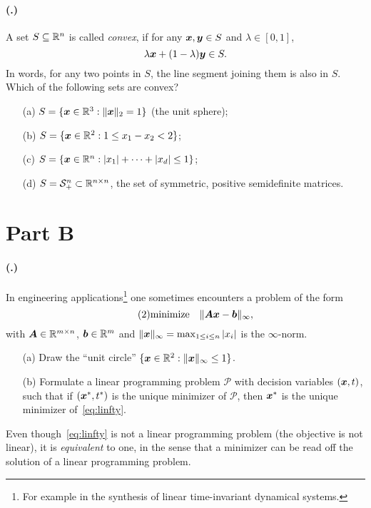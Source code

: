 \documentclass{article}
\newcounter{problemSheetNumber}
\newcounter{problems}
\renewcommand{\problem}{\paragraph{(\theproblemSheetNumber.\theproblems)}\addtocounter{problems}{1}}
\begin{document}
\problem A set $S\subseteq \mathbb{R}^n$ is called {\em convex}, if for any $\bm{x},\bm{y}\in S$ and $\lambda\in [0,1]$, 
\begin{equation*}
 \lambda \bm{x}+(1-\lambda)\bm{y}\in S.
\end{equation*}
In words, for any two points in $S$, the line segment joining them is also in $S$. Which of the following sets are convex?
\begin{itemize}
 \item[(a)] $S = \{\bm{x}\in \mathbb{R}^3 \mathrel{\mathop{:}} \Vert {\bm{x}}\Vert_2=1\}$ (the unit sphere);
 \item[(b)] $S = \{\bm{x}\in \mathbb{R}^2 \mathrel{\mathop{:}} 1\leq x_1-x_2< 2\}$;
 \item[(c)] $S = \{\bm{x}\in \mathbb{R}^n \mathrel{\mathop{:}} |x_1|+\cdots+|x_d|\leq 1\}$;
 \item[(d)] $S = \mathcal{S}^n_{+}\subset \mathbb{R}^{n\times n}$, the set of symmetric, positive semidefinite matrices.
\end{itemize}

\section*{Part B}

\problem 
In engineering applications\footnote{For example in the synthesis of linear time-invariant dynamical systems.} one sometimes encounters a problem of the form
\begin{equation}\label{eq:linfty}\tag{2}
 \text{minimize}\quad \Vert {\bm{A}\bm{x}-\bm{b}}\Vert_\infty,
\end{equation}
with $\bm{A}\in \mathbb{R}^{m\times n}$, $\bm{b}\in \mathbb{R}^m$ and $\Vert {\bm{x}}\Vert_\infty = \max_{1\leq i\leq n} |x_i|$ is the $\infty$-norm. 
\begin{itemize}
 \item[(a)] Draw the ``unit circle'' $\{\bm{x}\in \mathbb{R}^2 \mathrel{\mathop{:}} \Vert {\bm{x}}\Vert_\infty \leq 1\}$.
 \item[(b)] Formulate a linear programming problem $\mathcal{P}$ with decision variables $(\bm{x},t)$, such that if $(\bm{x}^*,t^*)$ is the unique minimizer of $\mathcal{P}$, then $\bm{x}^*$ is the unique minimizer of~\eqref{eq:linfty}. 
\end{itemize}
Even though~\eqref{eq:linfty} is not a linear programming problem (the objective is not linear), it is {\em equivalent} to one, in the sense that a minimizer can be read off the solution of a linear programming problem.
\end{document}
